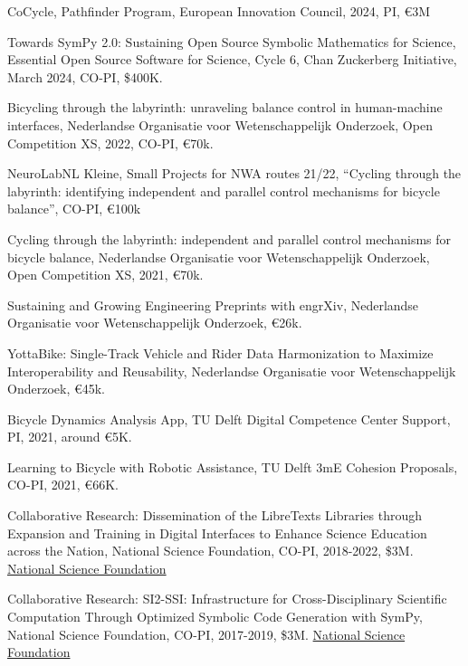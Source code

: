 \documentclass[10pt]{article}
\newenvironment{innerlist}[1][\enskip\textbullet]%
        {\begin{compactitem}[#1]}{\end{compactitem}}
\begin{document}
\begin{innerlist}
  \item CoCycle, Pathfinder Program, European Innovation Council, 2024, PI,
    \euro3M
  \item Towards SymPy 2.0: Sustaining Open Source Symbolic Mathematics for
    Science, Essential Open Source Software for Science, Cycle 6, Chan
    Zuckerberg Initiative, March 2024, CO-PI, \$400K.
  \item Bicycling through the labyrinth: unraveling balance control in
    human-machine interfaces, Nederlandse Organisatie voor Wetenschappelijk
    Onderzoek, Open Competition XS, 2022, CO-PI, \euro70k.
  \item NeuroLabNL Kleine, Small Projects for NWA routes 21/22, ``Cycling
    through the labyrinth: identifying independent and parallel control
    mechanisms for bicycle balance'', CO-PI, \euro100k
  \item Cycling through the labyrinth: independent and parallel control
    mechanisms for bicycle balance, Nederlandse
    Organisatie voor Wetenschappelijk Onderzoek, Open Competition XS, 2021, \euro70k.
  \item Sustaining and Growing Engineering Preprints with engrXiv, Nederlandse
    Organisatie voor Wetenschappelijk Onderzoek, \euro26k.
  \item YottaBike: Single-Track Vehicle and Rider Data Harmonization to
    Maximize Interoperability and Reusability, Nederlandse Organisatie voor
    Wetenschappelijk Onderzoek, \euro45k.
  \item Bicycle Dynamics Analysis App, TU Delft Digital Competence Center
    Support, PI, 2021, around \euro5K.
  \item Learning to Bicycle with Robotic Assistance, TU Delft 3mE Cohesion
    Proposals, CO-PI, 2021, \euro66K.
  \item Collaborative Research: Dissemination of the LibreTexts Libraries
    through Expansion and Training in Digital Interfaces to Enhance Science
    Education across the Nation, National Science Foundation, CO-PI, 2018-2022,
    \$3M. \href{http://nsf.gov}{National Science Foundation}
  \item Collaborative Research: SI2-SSI: Infrastructure for Cross-Disciplinary
    Scientific Computation Through Optimized Symbolic Code Generation with
    SymPy, National Science Foundation, CO-PI, 2017-2019, \$3M.
    \href{http://nsf.gov}{National Science Foundation}
\end{innerlist}
\end{document}
